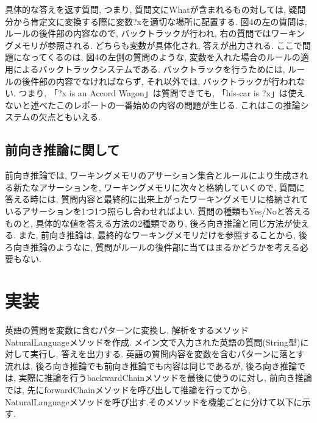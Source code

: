 \documentclass[uplatex,12pt]{jsarticle}
\begin{document}
具体的な答えを返す質問, つまり, 質問文にWhatが含まれるもの対しては, 疑問分から肯定文に変換する際に変数?xを適切な場所に配置する. 図4の左の質問は, ルールの後件部の内容なので, バックトラックが行われ, 右の質問ではワーキングメモリが参照される. どちらも変数が具体化され, 答えが出力される. ここで問題になってくるのは, 図4の左側の質問のような, 変数を入れた場合のルールの適用によるバックトラックシステムである. バックトラックを行うためには, ルールの後件部の内容でなければならず, それ以外では, バックトラックが行われない. つまり, 「?x is an Accord Wagon」は質問できても, 「his-car is ?x」は使えないと述べたこのレポートの一番始めの内容の問題が生じる. これはこの推論システムの欠点ともいえる.

\subsection{前向き推論に関して}
前向き推論では, ワーキングメモリのアサーション集合とルールにより生成される新たなアサーションを, ワーキングメモリに次々と格納していくので, 質問に答える時には, 質問内容と最終的に出来上がったワーキングメモリに格納されているアサーションを1つ1つ照らし合わせればよい.
質問の種類もYes/Noと答えるものと, 具体的な値を答える方法の2種類であり, 後ろ向き推論と同じ方法が使える. また, 前向き推論は, 最終的なワーキングメモリだけを参照することから, 後ろ向き推論のようなに, 質問がルールの後件部に当てはまるかどうかを考える必要もない.

\section{実装}
英語の質問を変数に含むパターンに変換し, 解析をするメソッドNaturalLanguageメソッドを作成. メイン文で入力された英語の質問(String型)に対して実行し, 答えを出力する. 英語の質問内容を変数を含むパターンに落とす流れは, 後ろ向き推論でも前向き推論でも内容は同じであるが, 後ろ向き推論では, 実際に推論を行うbackwardChainメソッドを最後に使うのに対し, 前向き推論では, 先にforwardChainメソッドを呼び出して推論を行ってから, NaturalLanguageメソッドを呼び出す.そのメソッドを機能ごとに分けて以下に示す.
\end{document}
